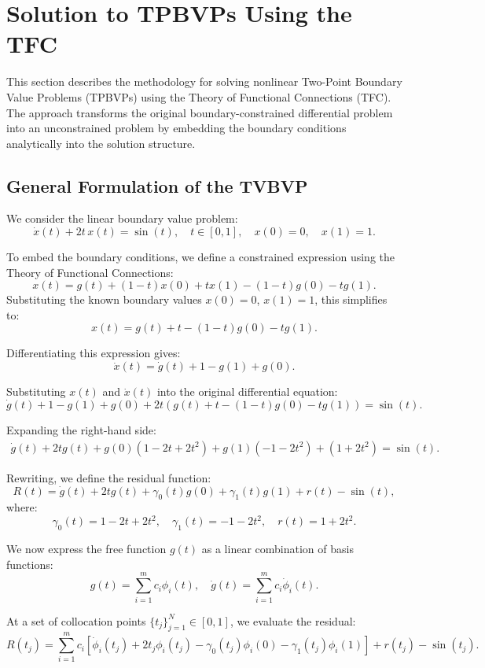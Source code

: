 \section{ Solution to TPBVPs Using the TFC}

This section describes the methodology for solving nonlinear Two-Point Boundary Value Problems (TPBVPs) using the Theory of Functional Connections (TFC). The approach transforms the original boundary-constrained differential problem into an unconstrained problem by embedding the boundary conditions analytically into the solution structure.

\subsection{General Formulation of the TVBVP}

We consider the linear boundary value problem\cite{furfaro2020least}:
\[
\dot{x}(t) + 2t\,x(t) = \sin(t), \quad t \in [0, 1], \quad x(0) = 0,\quad x(1) = 1.
\]

To embed the boundary conditions, we define a constrained expression using the Theory of Functional Connections:
\[
x(t) = g(t) + (1 - t)x(0) + t x(1) - (1 - t) g(0) - t g(1).
\]
Substituting the known boundary values \( x(0) = 0 \), \( x(1) = 1 \), this simplifies to:
\[
x(t) = g(t) + t - (1 - t)g(0) - t g(1).
\]

Differentiating this expression gives:
\[
\dot{x}(t) = \dot{g}(t) + 1 - g(1) + g(0).
\]

Substituting \( x(t) \) and \( \dot{x}(t) \) into the original differential equation:
\[
\dot{g}(t) + 1 - g(1) + g(0) + 2t\left( g(t) + t - (1 - t)g(0) - t g(1) \right) = \sin(t).
\]

Expanding the right-hand side:
\begin{align*}
\dot{g}(t) + 2t g(t) + g(0)(1 - 2t + 2t^2) + g(1)(-1 - 2t^2) + (1 + 2t^2) = \sin(t).
\end{align*}

Rewriting, we define the residual function:
\[
R(t) = \dot{g}(t) + 2t g(t) + \gamma_0(t) g(0) + \gamma_1(t) g(1) + r(t) - \sin(t),
\]
where:
\[
\gamma_0(t) = 1 - 2t + 2t^2, \quad \gamma_1(t) = -1 - 2t^2, \quad r(t) = 1 + 2t^2.
\]

We now express the free function \( g(t) \) as a linear combination of basis functions:
\[
g(t) = \sum_{i=1}^{m} c_i \phi_i(t), \quad \dot{g}(t) = \sum_{i=1}^{m} c_i \dot{\phi}_i(t).
\]

At a set of collocation points \( \{ t_j \}_{j=1}^N \in [0,1] \), we evaluate the residual:
\[
R(t_j) = \sum_{i=1}^{m} c_i \left[ \dot{\phi}_i(t_j) + 2t_j \phi_i(t_j) - \gamma_0(t_j)\phi_i(0) - \gamma_1(t_j)\phi_i(1) \right] + r(t_j) - \sin(t_j).
\]

